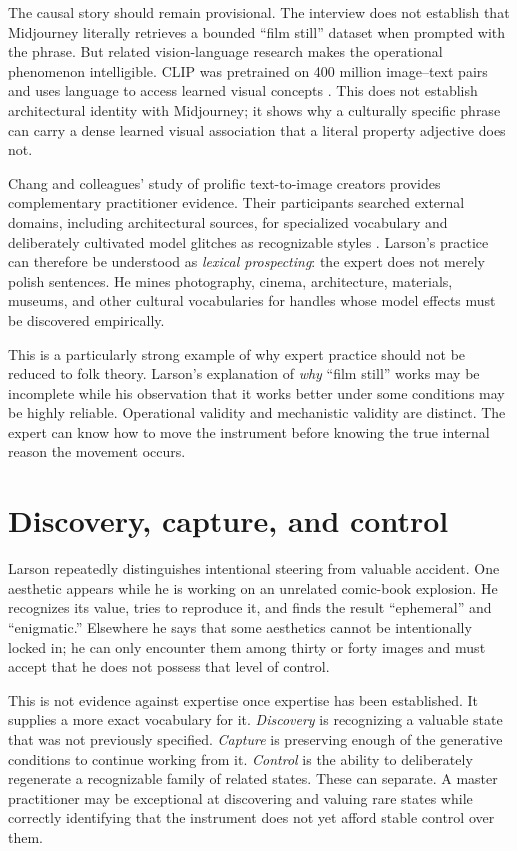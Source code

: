 \documentclass[11pt]{article}
\begin{document}
The causal story should remain provisional. The interview does not establish that Midjourney literally retrieves a bounded ``film still'' dataset when prompted with the phrase. But related vision-language research makes the operational phenomenon intelligible. CLIP was pretrained on 400 million image--text pairs and uses language to access learned visual concepts \cite{RadfordEtAl2021}. This does not establish architectural identity with Midjourney; it shows why a culturally specific phrase can carry a dense learned visual association that a literal property adjective does not.

Chang and colleagues' study of prolific text-to-image creators provides complementary practitioner evidence. Their participants searched external domains, including architectural sources, for specialized vocabulary and deliberately cultivated model glitches as recognizable styles \cite{ChangEtAl2023PromptArtists}. Larson's practice can therefore be understood as \emph{lexical prospecting}: the expert does not merely polish sentences. He mines photography, cinema, architecture, materials, museums, and other cultural vocabularies for handles whose model effects must be discovered empirically.

This is a particularly strong example of why expert practice should not be reduced to folk theory. Larson's explanation of \emph{why} ``film still'' works may be incomplete while his observation that it works better under some conditions may be highly reliable. Operational validity and mechanistic validity are distinct. The expert can know how to move the instrument before knowing the true internal reason the movement occurs.

\section{Discovery, capture, and control}
Larson repeatedly distinguishes intentional steering from valuable accident. One aesthetic appears while he is working on an unrelated comic-book explosion. He recognizes its value, tries to reproduce it, and finds the result ``ephemeral'' and ``enigmatic.'' Elsewhere he says that some aesthetics cannot be intentionally locked in; he can only encounter them among thirty or forty images and must accept that he does not possess that level of control.

This is not evidence against expertise once expertise has been established. It supplies a more exact vocabulary for it. \emph{Discovery} is recognizing a valuable state that was not previously specified. \emph{Capture} is preserving enough of the generative conditions to continue working from it. \emph{Control} is the ability to deliberately regenerate a recognizable family of related states. These can separate. A master practitioner may be exceptional at discovering and valuing rare states while correctly identifying that the instrument does not yet afford stable control over them.
\end{document}
